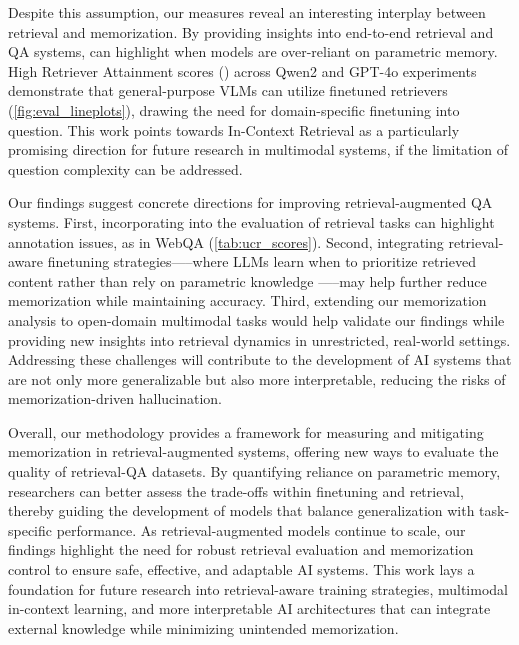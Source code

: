 Despite this assumption, our measures reveal an interesting interplay between retrieval and memorization. By providing insights into end-to-end retrieval and QA systems, \UCR can highlight when models are over-reliant on parametric memory. High Retriever Attainment scores (\RPA) across Qwen2 and GPT-4o experiments demonstrate that general-purpose VLMs can utilize finetuned retrievers (\autoref{fig:eval_lineplots}), drawing the need for domain-specific finetuning into question. This work points towards In-Context Retrieval as a particularly promising direction for future research in multimodal systems, if the limitation of question complexity can be addressed.

Our findings suggest concrete directions for improving retrieval-augmented QA systems. First, incorporating \ucr into the evaluation of retrieval tasks can highlight annotation issues, as in WebQA (\autoref{tab:ucr_scores}). Second, integrating retrieval-aware finetuning strategies—--where LLMs learn when to prioritize retrieved content rather than rely on parametric knowledge \citep{labruna2024retrieve}—--may help further reduce memorization while maintaining accuracy. Third, extending our memorization analysis to open-domain multimodal tasks would help validate our findings while providing new insights into retrieval dynamics in unrestricted, real-world settings. Addressing these challenges will contribute to the development of AI systems that are not only more generalizable but also more interpretable, reducing the risks of memorization-driven hallucination.

Overall, our methodology provides a framework for measuring and mitigating memorization in retrieval-augmented systems, offering new ways to evaluate the quality of retrieval-QA datasets. By quantifying reliance on parametric memory, researchers can better assess the trade-offs within finetuning and retrieval, thereby guiding the development of models that balance generalization with task-specific performance. As retrieval-augmented models continue to scale, our findings highlight the need for robust retrieval evaluation and memorization control to ensure safe, effective, and adaptable AI systems. This work lays a foundation for future research into retrieval-aware training strategies, multimodal in-context learning, and more interpretable AI architectures that can integrate external knowledge while minimizing unintended memorization.









